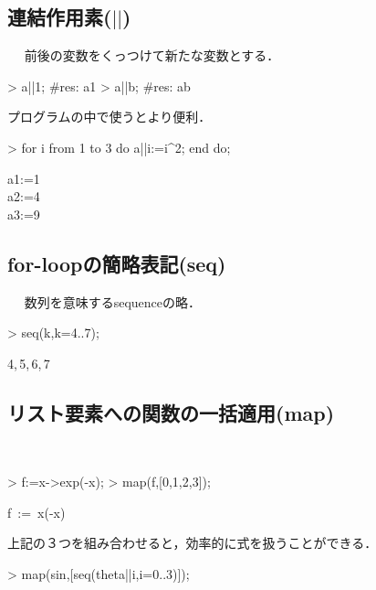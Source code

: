\subsection{連結作用素($||$)}　
前後の変数をくっつけて新たな変数とする．
\begin{MapleInput}
> a||1; #res: a1
> a||b; #res: ab
\end{MapleInput}
プログラムの中で使うとより便利．
\begin{MapleInput}
> for i from 1 to 3 do
    a||i:=i^2; 
  end do;
\end{MapleInput}
\begin{MapleOutputGather}
a1:=1 \notag \\
a2:=4 \notag \\
a3:=9 \notag
\end{MapleOutputGather}

\subsection{for-loopの簡略表記(seq)}　
数列を意味するsequenceの略．
\begin{MapleInput}
> seq(k,k=4..7);
\end{MapleInput}
\begin{MapleOutput}
4,\,5,\,6,\,7
\end{MapleOutput}

\subsection{リスト要素への関数の一括適用(map)}　
\begin{MapleInput}
> f:=x->exp(-x); 
> map(f,[0,1,2,3]);
\end{MapleInput}
\begin{MapleOutputGather}
f\, := \,x\mapsto \exp(-x)  \notag \\
[1,\exp(-1),\exp(-2),\exp(-3)] \notag
\end{MapleOutputGather}

上記の３つを組み合わせると，効率的に式を扱うことができる．
\begin{MapleInput}
> map(sin,[seq(theta||i,i=0..3)]);
\end{MapleInput}
\begin{MapleOutput}
\end{MapleOutput}

